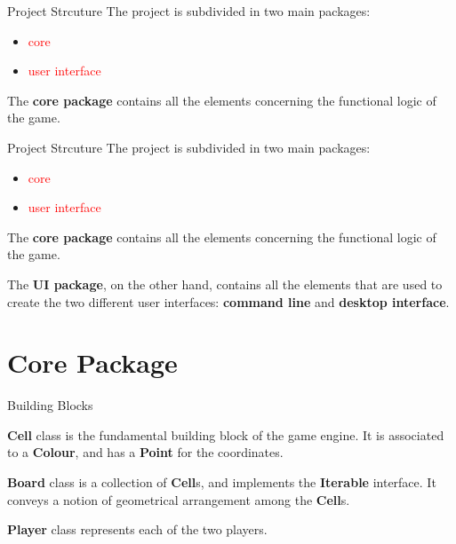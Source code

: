 \documentclass{beamer}
\begin{document}
 \begin{frame}{Project  Strcuture}
  The project is subdivided in two main packages:
  \begin{itemize}
        \item \textcolor{red}{core}
        \item \textcolor{red}{user interface}
   \end{itemize}

 \vspace{1em}

  The \textbf{core package}  contains all the elements concerning the functional logic of the game.

 \vspace{2em}

	
 \end{frame}

 \begin{frame}{Project  Strcuture}
  The project is subdivided in two main packages:
  \begin{itemize}
        \item \textcolor{red}{core}
        \item \textcolor{red}{user interface}
   \end{itemize}

 \vspace{1em}

  The \textbf{core package}  contains all the elements concerning the functional logic of the game.

 \vspace{1em}

 The \textbf{UI package}, on the other hand, contains all the elements that are used to create the two different user interfaces: \textbf{command line} and \textbf{desktop interface}.
	
 \end{frame}



\section{Core Package}

\begin{frame}{Building Blocks}

\textbf{Cell} class is the fundamental building block of the game engine. It is associated to a \textbf{Colour}, and has a \textbf{Point} for the coordinates.

\vspace{1em}

\textbf{Board} class is a collection of \textbf{Cell}s, and implements the \textbf{Iterable} interface. It conveys a notion of geometrical arrangement among the \textbf{Cell}s.

\vspace{1em}

\textbf{Player} class represents each of the two players.

\end{frame}
\end{document}
